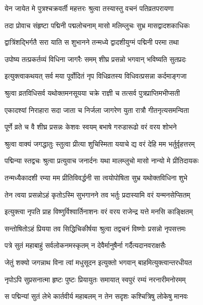 \twolineshloka
{येन जायेत मे पुत्रश्चक्रवर्ती महत्तरः}
{श्रुत्वा तस्यास्तु वचनं पतिव्रतपरायणा} %

\twolineshloka
{तदा प्रोवाच संहृष्टा पद्मिनी पद्मलोचनाम् मासो}
{मलिम्लुचः सुभ्र मासद्वादशकाधिकः} %

\twolineshloka
{द्वात्रिंशद्भिर्गतै सरा याति स शुभानने}
{तन्मध्ये द्वादशीयुग्मं पद्मिनी परमा तथा} %

\twolineshloka
{उपोष्य तत्प्रकर्तव्यं विधिना जागरैः समम्}
{शीघ्र प्रसन्नो भगवान् भविष्यति सुतप्रदः} %

\twolineshloka
{इत्युक्त्वाकथयत् सर्व मया पूर्वोदितं नृप}
{विधिव्रतस्य विधिवत्प्रसन्ना कर्दमाङ्गजा} %

\twolineshloka
{श्रुत्वा व्रतविधिसर्व यथोक्तमनसूयया}
{चक्रे राज्ञी च तत्सर्व पुत्रप्राप्तिमभीप्सती} %

\twolineshloka
{एकादश्यां निराहारा सदा जाता च निर्जला}
{जागरेण युता रात्रौ गीतनृत्यसमन्विता} %

\twolineshloka
{पूर्णे व्रते च वै शीघ्र प्रसन्नः केशवः स्वयम्}
{बभाषे गरुडारूढो वरं वरय शोभने} %

\twolineshloka
{श्रुत्वा वाक्यं जगद्धातुः स्तुत्वा प्रीत्या शुचिस्मिता}
{ययाचे द्य वरं देहि मम भर्तुर्वृहत्तरम्} %

\twolineshloka
{पद्मिन्या स्तद्वचः श्रुत्वा प्रत्युवाच जनार्दनः}
{यथा मालम्लुचो मासो नान्यो मे प्रीतिदायकः} %

\twolineshloka
{तन्मध्यैकादशी रम्या मम प्रीतिविवर्द्धनी}
{सा त्वयोपोषिता सुभ्र यथोक्तविधिना शुभे} %

\twolineshloka
{तेन त्वया प्रसन्नोऽहं कृतोऽस्मि सुभगानने}
{तव भर्तुः प्रदास्यामि वरं यन्मनसेप्सितम्} %

\twolineshloka
{इत्युक्त्वा नृपति प्राह विष्णुर्विश्वार्तिनाशनः}
{वरं वरय राजेन्द्र यत्ते मनसि काङ्क्षितम्} %

\twolineshloka
{सन्तोषितोऽहं प्रियया तव सिद्धिचिकीर्षया}
{श्रुत्वा तद्वचनं विष्णोः प्रसन्नो नृपसत्तमः} %

\twolineshloka
{पत्रे सुतं महाबाहुं सर्वलोकनमस्कृतम्}
{न देवैर्मानुषैर्ना गर्दैत्यदानवराक्षसैः} %

\twolineshloka
{जेतुं शक्यो जगन्नाथ विना त्वां मधुसूदन}
{इत्युक्तो भगवान् बाहमित्युक्त्वान्तरधीयत} %

\twolineshloka
{नृपोऽपि सुप्रसनात्मा हृष्टः पुष्टः प्रियायुतः}
{समायात् स्वपुरं रम्यं नरनारीमनोरमम्} %

\twolineshloka
{स पद्मिन्यां सुतं लेभे कार्तवीर्य महाबलम्}
{न तेन सदृशः कश्चित्रिषु लोकेषु मानवः} %

